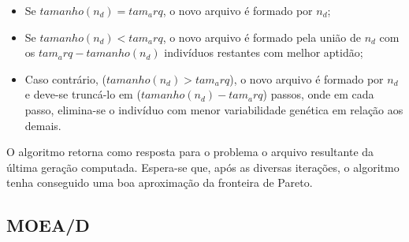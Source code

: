 \begin{itemize}  
	\item Se $tamanho(n_d) = tam_arq$, o novo arquivo é formado por $n_d$;
	\item Se $tamanho(n_d) < tam_arq$, o novo arquivo é formado pela união de $n_d$ com os $tam_arq - tamanho(n_d)$ indivíduos restantes com melhor aptidão;
	\item Caso contrário, ($tamanho(n_d) > tam_arq$), o novo arquivo é formado por $n_d$ e deve-se truncá-lo em ($tamanho(n_d) - tam_arq$) passos, onde em cada passo, elimina-se o indivíduo com menor variabilidade genética em relação aos demais.
\end{itemize}

O algoritmo retorna como resposta para o problema o arquivo resultante da última geração computada. Espera-se que, após as diversas iterações, o algoritmo tenha conseguido uma boa aproximação da fronteira de Pareto.



\subsection{MOEA/D}
\label{section_moead}

